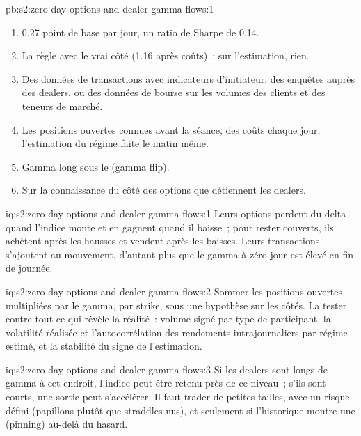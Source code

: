 \begin{solution}{pb:s2:zero-day-options-and-dealer-gamma-flows:1}
\begin{enumerate}
\item 0.27 point de base par jour, un ratio de Sharpe de 0.14.
\item La règle avec le vrai côté (1.16 après coûts)~; sur l'estimation, rien.
\item Des données de transactions avec indicateurs d'initiateur, des enquêtes auprès des dealers, ou des données de bourse sur les volumes des clients et des teneurs de marché.
\item Les positions ouvertes connues avant la séance, des coûts chaque jour, l'estimation du régime faite le matin même.
\item Gamma long sous le  (gamma flip).
\item Sur la connaissance du côté des options que détiennent les dealers.
\end{enumerate}
\end{solution}

\begin{solution}{iq:s2:zero-day-options-and-dealer-gamma-flows:1}
Leurs options perdent du delta quand l'indice monte et en gagnent quand il baisse~; pour rester couverts, ils achètent après les hausses et
vendent après les baisses. Leurs transactions s'ajoutent au mouvement, d'autant plus que le gamma à zéro jour est élevé en fin de journée.
\end{solution}

\begin{solution}{iq:s2:zero-day-options-and-dealer-gamma-flows:2}
Sommer les positions ouvertes multipliées par le gamma, par strike, sous une hypothèse sur les côtés. La tester contre tout ce qui révèle la réalité~: volume signé par
type de participant, la volatilité réalisée et l'autocorrélation des rendements intrajournaliers par régime estimé, et la stabilité du signe de l'estimation.
\end{solution}

\begin{solution}{iq:s2:zero-day-options-and-dealer-gamma-flows:3}
Si les dealers sont longs de gamma à cet endroit, l'indice peut être retenu près de ce niveau~; s'ils sont courts, une sortie peut s'accélérer. Il faut trader de petites tailles, avec un risque défini (papillons
plutôt que straddles nus), et seulement si l'historique montre une  (pinning) au-delà du hasard.
\end{solution}

